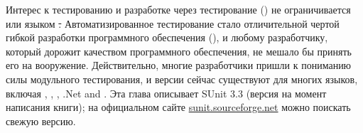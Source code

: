 \documentclass[a4paper,10pt,twoside]{book}
\begin{document}
Интерес к тестированию и разработке через тестирование ()
не ограничивается \pharo или языком \st.
Автоматизированное тестирование стало отличительной чертой гибкой разработки программного обеспечения
(), и любому
разработчику, который дорожит качеством программного обеспечения, не мешало бы принять его на вооружение.
Действительно, многие разработчики пришли к пониманию
силы модульного тестирования, и версии \xUnit{} сейчас существуют для многих языков,
включая , , , .Net and .
Эта глава описывает SUnit 3.3 (версия на момент написания книги);
на официальном сайте \url{sunit.sourceforge.net} можно поискать свежую версию.
\end{document}

